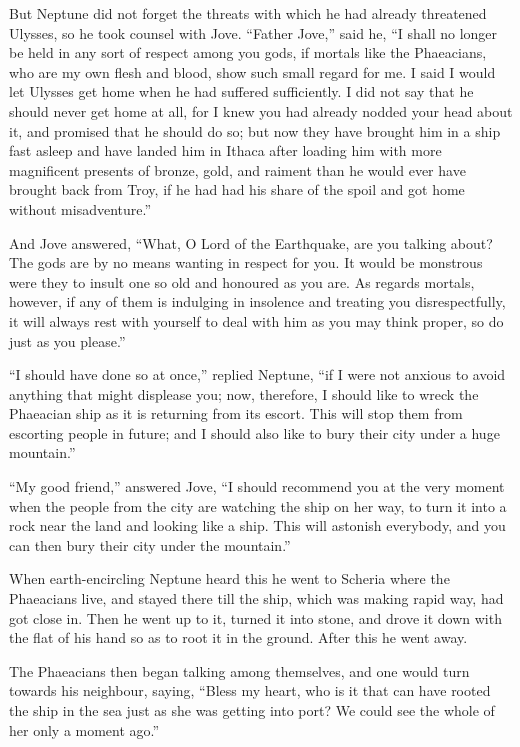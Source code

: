 But Neptune did not forget the threats with which he had already threatened
Ulysses, so he took counsel with Jove. “Father Jove,” said he, “I shall no
longer be held in any sort of respect among you gods, if mortals like the
Phaeacians, who are my own flesh and blood, show such small regard for me. I
said I would let Ulysses get home when he had suffered sufficiently. I did not
say that he should never get home at all, for I knew you had already nodded
your head about it, and promised that he should do so; but now they have
brought him in a ship fast asleep and have landed him in Ithaca after loading
him with more magnificent presents of bronze, gold, and raiment than he would
ever have brought back from Troy, if he had had his share of the spoil and got
home without misadventure.”

And Jove answered, “What, O Lord of the Earthquake, are you talking about? The
gods are by no means wanting in respect for you. It would be monstrous were
they to insult one so old and honoured as you are. As regards mortals, however,
if any of them is indulging in insolence and treating you disrespectfully, it
will always rest with yourself to deal with him as you may think proper, so do
just as you please.”

“I should have done so at once,” replied Neptune, “if I were not anxious to
avoid anything that might displease you; now, therefore, I should like to wreck
the Phaeacian ship as it is returning from its escort. This will stop them from
escorting people in future; and I should also like to bury their city under a
huge mountain.”

“My good friend,” answered Jove, “I should recommend you at the very moment
when the people from the city are watching the ship on her way, to turn it into
a rock near the land and looking like a ship. This will astonish everybody, and
you can then bury their city under the mountain.”

When earth-encircling Neptune heard this he went to Scheria where the
Phaeacians live, and stayed there till the ship, which was making rapid way,
had got close in. Then he went up to it, turned it into stone, and drove it
down with the flat of his hand so as to root it in the ground. After this he
went away.

The Phaeacians then began talking among themselves, and one would turn towards
his neighbour, saying, “Bless my heart, who is it that can have rooted the ship
in the sea just as she was getting into port? We could see the whole of her
only a moment ago.”

